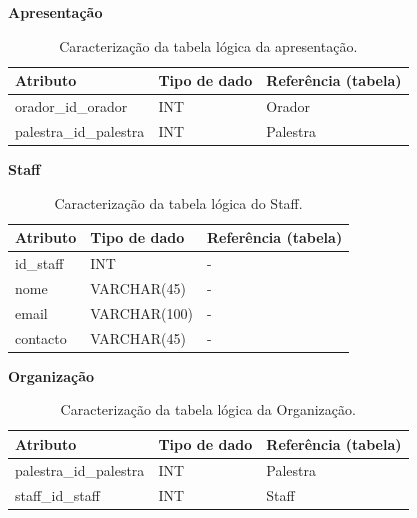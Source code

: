 \documentclass[12pt,a4paper]{article}
\renewcommand{\arraystretch}{1.5}  %
\begin{document}
\begin{table}[H]
\textbf{Apresentação}

\centering
\renewcommand{\arraystretch}{1.2}
\begin{tabularx}{\textwidth}{|X|l|X|}
\hline
\textbf{Atributo} & \textbf{Tipo de dado} & \textbf{Referência (tabela)} \\ \hline

orador\_id\_orador & INT & Orador \\ \hline
palestra\_id\_palestra & INT & Palestra\\ \hline

\end{tabularx}
\caption{Caracterização da tabela lógica da apresentação.}
\end{table}

\begin{table}[H]
\textbf{Staff}

\centering
\renewcommand{\arraystretch}{1.2}
\begin{tabularx}{\textwidth}{|X|l|X|}
\hline
\textbf{Atributo} & \textbf{Tipo de dado} & \textbf{Referência (tabela)} \\ \hline

id\_staff & INT & - \\ \hline
nome & VARCHAR(45) & - \\ \hline
email & VARCHAR(100) & - \\ \hline
contacto & VARCHAR(45) & - \\ \hline

\end{tabularx}
\caption{Caracterização da tabela lógica do Staff.}
\end{table}

\begin{table}[H]
\textbf{Organização}

\centering
\renewcommand{\arraystretch}{1.2}
\begin{tabularx}{\textwidth}{|X|l|X|}
\hline
\textbf{Atributo} & \textbf{Tipo de dado} & \textbf{Referência (tabela)} \\ \hline

palestra\_id\_palestra & INT & Palestra \\ \hline
staff\_id\_staff & INT & Staff \\ \hline

\end{tabularx}
\caption{Caracterização da tabela lógica da Organização.}
\end{table}
\end{document}
